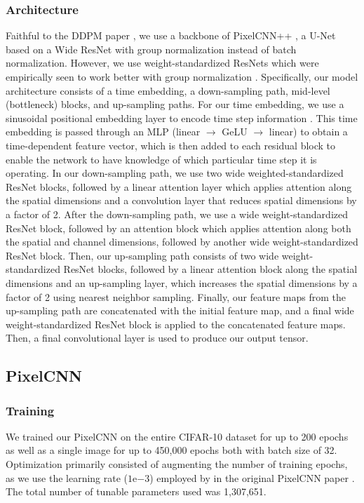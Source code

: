 \documentclass[10pt,twocolumn,letterpaper]{article}
\begin{document}
\subsubsection{Architecture}
Faithful to the DDPM paper \cite{DDPM}, we use a backbone of PixelCNN++ \cite{Salimans2017PixeCNN}, a U-Net \cite{DBLP:journals/corr/RonnebergerFB15} based on a Wide ResNet \cite{DBLP:journals/corr/ZagoruykoK16} with group normalization \cite{DBLP:journals/corr/GroupNorm} instead of batch normalization. However, we use weight-standardized ResNets which were empirically seen to work better with group normalization \cite{DBLP:journals/corr/WeightStandardization, DBLP:journals/corr/BiT}. Specifically, our model architecture consists of a time embedding, a down-sampling path, mid-level (bottleneck) blocks, and up-sampling paths. For our time embedding, we use a sinusoidal positional embedding layer to encode time step information \cite{NIPS2017_3f5ee243, DBLP:journals/corr/HendrycksG16}. This time embedding is passed through an MLP (linear $\rightarrow$ GeLU $\rightarrow$ linear) to obtain a time-dependent feature vector, which is then added to each residual block to enable the network to have knowledge of which particular time step it is operating. In our down-sampling path, we use two wide weighted-standardized ResNet blocks, followed by a linear attention \cite{katharopoulos-et-al-2020, shen2019efficient} layer which applies attention along the spatial dimensions and a convolution layer that reduces spatial dimensions by a factor of 2. After the down-sampling path, we use a wide weight-standardized ResNet block, followed by an attention block \cite{NIPS2017_3f5ee243} which applies attention along both the spatial and channel dimensions, followed by another wide weight-standardized ResNet block. Then, our up-sampling path consists of two wide weight-standardized ResNet blocks, followed by a linear attention block along the spatial dimensions and an up-sampling layer, which increases the spatial dimensions by a factor of 2 using nearest neighbor sampling. Finally, our feature maps from the up-sampling path are concatenated with the initial feature map, and a final wide weight-standardized ResNet block is applied to the concatenated feature maps. Then, a final convolutional layer is used to produce our output tensor.

\subsection{PixelCNN}
\subsubsection{Training}
We trained our PixelCNN on the entire CIFAR-10 dataset for up to 200 epochs as well as a single image for up to 450,000 epochs both with batch size of 32. Optimization primarily consisted of augmenting the number of training epochs, as we use the learning rate ($1\mathrm{e}{-3}$) employed by in the original PixelCNN paper \cite{PixelCNN, pixelrnn}. The total number of tunable parameters used was 1,307,651. 
\end{document}
